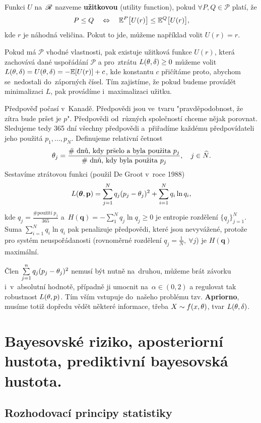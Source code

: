 \begin{define}
	Funkci $U$ na~$\mathscr{R}$ nazveme \textbf{užitkovou} (utility function), pokud $\forall P,Q\in\mathcal{P}$ platí, že 
	$$ P\leq Q\quad\Leftrightarrow\quad\mathbb{E}^P\big[U(r)\big]\leq\mathbb{E}^Q\big[U(r)\big],$$ kde $r$ je náhodná veličina. Pokut to jde, můžeme například volit $U(r)=r$.
\end{define}
\begin{remark}
	Pokud má $\mathcal{P}$ vhodné vlastnosti, pak existuje užitková funkce $U(r)$, která zachovává dané uspořádání $\mathcal{P}$ a pro~ztrátu $L(\theta,\delta)\geq 0$ můžeme volit $L(\theta,\delta)=U(\theta,\delta)=-\mathbb{E}[U(r)]+c$, kde konstantu $c$ přičítáme proto, abychom se~nedostali do~záporných čísel. Tím zajistíme, že pokud budeme provádět minimalizaci $L$, pak provádíme i~maximalizaci užitku.
\end{remark}
\begin{example}[volba L]
		Předpověď počasí v~Kanadě. Předpovědi jsou ve~tvaru "pravděpodobnost, že zítra bude pršet je $p$". Předpovědi od~různých společností chceme nějak porovnat. Sledujeme tedy 365 dní všechny předpovědi a~přiřadíme každému předpovídateli jeho použitá $p_1,...,p_N$. Definujeme relativní četnost $$\theta_j=\frac{\text{\# dnů, kdy pršelo a~byla použita }p_j}{\text{\# dnů, kdy byla použita }p_j},\quad j\in\widehat{N}.$$ Sestavíme ztrátovou funkci (použil De Groot v~roce 1988) $$L(\boldsymbol{\theta},\textbf{p})=\sum_{j=1}^N q_j(p_j-\theta_j)^2+\sum_{i=1}^N q_i\ln q_i,$$ kde $q_j=\frac{\text{\# použití }p_j}{365}$ a~$H(\textbf{q})=-\sum_1^N q_j\ln q_j\geq 0$ je entropie rozdělení $\{q_j\}_{j=1}^N$. Suma $\sum_{i=1}^N q_i\ln q_i$ pak penalizuje předpovědi, které jsou nevyvážené, protože pro systém neuspořádanosti (rovnoměrné rozdělení $q_j=\frac{1}{N},~\forall j$) je $H(\textbf{q})$ maximální.
		
		Člen $\sum\limits_{j=1}^{n} q_j(p_j-\theta_j)^2$ nemusí být nutně na~druhou, můžeme brát závorku i~v~absolutní hodnotě, případně ji umocnit na~$\alpha\in(0,2)$ a regulovat tak robustnost $L(\theta,p)$. Tím vším vstupuje do~našeho problému tzv. \textbf{Apriorno}, musíme totiž dopředu vědět některé informace, třeba $X\sim f(x,\theta)$, tvar $L(\theta,\delta)$. 
\end{example}

\chapter{Bayesovské riziko, aposteriorní hustota, prediktivní bayesovská hustota.}

\section{Rozhodovací principy statistiky}

